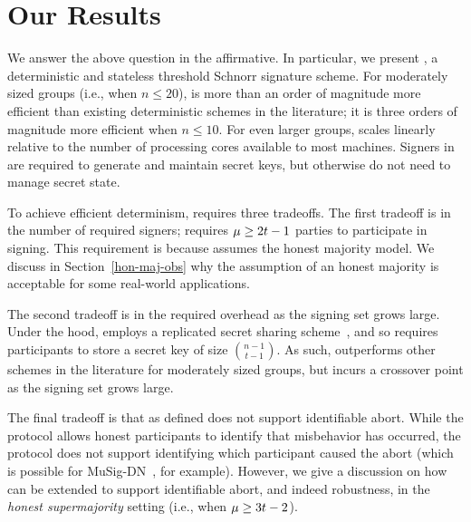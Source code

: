 \section{Our Results}
We answer the above question in the affirmative.
In particular, we present \glitter,
a deterministic and stateless threshold Schnorr signature scheme.
For moderately sized groups (i.e., when $n \leq 20$),
\glitter is more than an order of magnitude more efficient than existing deterministic schemes in the literature;
it is three orders of magnitude more efficient when $n \leq 10$.
For even larger groups,
\glitter scales linearly relative to the number of processing cores available to most machines.
Signers in \glitter are required to generate and maintain secret keys,
but otherwise do not need to manage secret state.

To achieve efficient determinism,
\glitter requires three tradeoffs.
The first tradeoff is in the number of required signers;
\glitter requires $\mu \geq 2t-1$ parties to participate in signing.
This requirement is because \glitter assumes the honest majority model.
We discuss in Section~\ref{hon-maj-obs} why the assumption of an honest majority is acceptable for some real-world applications.

The second tradeoff is in the required overhead as the signing set grows large.
Under the hood, \glitter employs a replicated secret sharing scheme~\cite{MitsuruSN89},
and so requires participants to store a secret key of size
${n-1  \choose t-1}$.
As such,
\glitter outperforms other schemes in the literature for moderately sized groups,
but incurs a crossover point as the signing set grows large.

The final tradeoff is that \glitter as defined does not support identifiable abort.
While the protocol allows honest participants to identify that misbehavior has occurred,
the protocol does not support identifying which participant caused the abort
(which is possible for MuSig-DN~\cite{NickRSW20}, for example).
However,
we give a discussion on how \glitter can be extended to support identifiable abort,
and indeed robustness,
in the \emph{honest supermajority} setting (i.e., when $\mu \geq 3t-2$).



